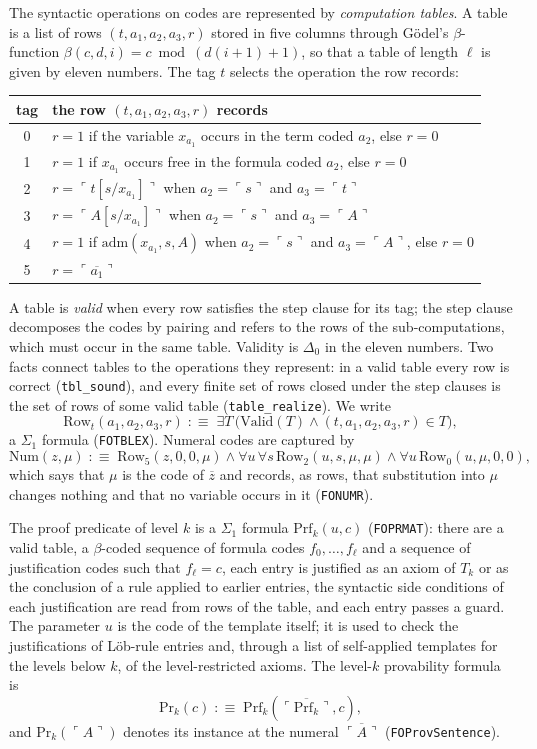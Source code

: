 \documentclass[11pt]{article}
\theoremstyle{plain}
\theoremstyle{definition}
\theoremstyle{remark}
\newcommand{\T}[1]{T_{#1}}
\newcommand{\Prv}{\mathrm{Pr}}
\newcommand{\gn}[1]{\ulcorner #1 \urcorner}
\newcommand{\num}[1]{\overline{#1}}
\newcommand{\Row}{\mathrm{Row}}
\newcommand{\Num}{\mathrm{Num}}
\newcommand{\rocq}[1]{\texttt{#1}}
\newcommand{\Ddelta}{\Delta_0}
\newcommand{\Ssigma}{\Sigma_1}
\begin{document}
The syntactic operations on codes are represented by \emph{computation
tables}.  A table is a list of rows $(t, a_1, a_2, a_3, r)$ stored in
five columns through G\"odel's $\beta$-function
$\beta(c,d,i) = c \bmod (d(i+1)+1)$, so that a table of length $\ell$ is
given by eleven numbers.  The tag $t$ selects the operation the row
records:
\begin{center}
\begin{tabular}{@{}cl@{}}
\toprule
tag & the row $(t,a_1,a_2,a_3,r)$ records \\
\midrule
0 & $r = 1$ if the variable $x_{a_1}$ occurs in the term coded $a_2$, else $r=0$\\
1 & $r = 1$ if $x_{a_1}$ occurs free in the formula coded $a_2$, else $r=0$\\
2 & $r = \gn{t[s/x_{a_1}]}$ when $a_2 = \gn{s}$ and $a_3 = \gn{t}$\\
3 & $r = \gn{A[s/x_{a_1}]}$ when $a_2 = \gn{s}$ and $a_3 = \gn{A}$\\
4 & $r = 1$ if $\mathrm{adm}(x_{a_1}, s, A)$ when $a_2=\gn s$ and $a_3 = \gn A$, else $r=0$\\
5 & $r = \gn{\num{a_1}}$\\
\bottomrule
\end{tabular}
\end{center}
A table is \emph{valid} when every row satisfies the step clause for its
tag; the step clause decomposes the codes by pairing and refers to the
rows of the sub-computations, which must occur in the same table.
Validity is $\Ddelta$ in the eleven numbers.  Two facts connect tables
to the operations they represent: in a valid table every row is correct
(\rocq{tbl\_sound}), and every finite set of rows closed under the step
clauses is the set of rows of some valid table (\rocq{table\_realize}).
We write
\[
  \Row_t(a_1,a_2,a_3,r) \;:\equiv\; \exists T\,\bigl(\mathrm{Valid}(T)
  \wedge (t,a_1,a_2,a_3,r) \in T\bigr),
\]
a $\Ssigma$ formula (\rocq{FOTBLEX}).  Numeral codes are captured by
\[
  \Num(z,\mu) \;:\equiv\; \Row_5(z,0,0,\mu) \wedge
  \forall u\,\forall s\, \Row_2(u,s,\mu,\mu) \wedge
  \forall u\, \Row_0(u,\mu,0,0),
\]
which says that $\mu$ is the code of $\num{z}$ and records, as rows,
that substitution into $\mu$ changes nothing and that no variable occurs
in it (\rocq{FONUMR}).

The proof predicate of level $k$ is a $\Ssigma$ formula
$\mathrm{Prf}_k(u, c)$ (\rocq{FOPRMAT}): there are a valid table, a
$\beta$-coded sequence of formula codes $f_0,\dots,f_\ell$ and a
sequence of justification codes such that $f_\ell = c$, each entry is
justified as an axiom of $\T{k}$ or as the conclusion of a rule applied
to earlier entries, the syntactic side conditions of each justification
are read from rows of the table, and each entry passes a guard.  The
parameter $u$ is the code of the template itself; it is used to check
the justifications of L\"ob-rule entries and, through a list of
self-applied templates for the levels below $k$, of the level-restricted
axioms.  The level-$k$ provability formula is
\[
  \Prv_k(c) \;:\equiv\; \mathrm{Prf}_k(\num{\gn{\mathrm{Prf}_k}}, c),
\]
and $\Prv_k(\gn{A})$ denotes its instance at the numeral
$\num{\gn{A}}$ (\rocq{FOProvSentence}).
\end{document}
